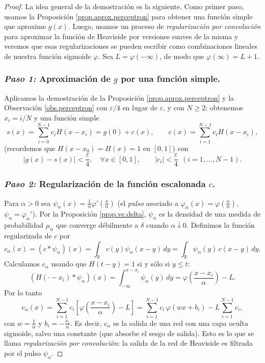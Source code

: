 \documentclass[12pt, a4paper]{amsbook}
\newcommand{\ve}{\varepsilon}
\newcommand{\R}{{\mathbb R}}
\theoremstyle{remark}
\theoremstyle{definition}
\numberwithin{section}{chapter}
\numberwithin{subsection}{section}
\numberwithin{equation}{section}
\numberwithin{figure}{chapter}
\begin{document}
\begin{proof}
La idea general de la demostración es la siguiente. Como primer paso, usamos la Proposición \ref{prop.aprox.perceptron} para obtener una función simple que aproxime $g(x)$. Luego, usamos un proceso de {\em regularización por convolución} para aproximar la función de Heaviside por versiones suaves de la misma y veremos que esas regularizaciones se pueden escribir como combinaciones lineales de nuestra función sigmoide $\varphi$. Sea $L=\varphi(-\infty)$, de modo que $\varphi(\infty)=L+1$.

\subsubsection*{{\em Paso 1:}  Aproximación de $g$ por una función simple.}

Aplicamos la demostración de la Proposición \ref{prop.aprox.perceptron} y la Observación \ref{obs.perceptron} con $\ve/4$ en lugar de $\ve$, y con $N\ge2$: obtenemos $x_i=i/N$ y una función simple
$$
s(x)=\sum_{i=0}^{N-1}c_iH(x-x_i)=g(0)+c(x),\qquad c(x)=\sum_{i=1}^{N-1}c_iH(x-x_i),
$$
(recordemos que $H(x-x_0)=H(x)=1$ en $[0,1]$) con
$$
|g(x)-s(x)|<\frac{\ve}{4},\quad \forall x\in [0, 1],\qquad |c_i|<\frac{\ve}{4}\ \ (i=1,\dots,N-1).
$$

\subsubsection*{{\em Paso 2:} Regularización de la función escalonada $c$.}

Para $\alpha>0$ sea $\psi_\alpha(x) = \frac{1}{\alpha}\varphi'(\frac{x}{\alpha})$ (el {\em pulso} asociado a $\varphi_\alpha(x)=\varphi(\frac{x}{\alpha})$, $\psi_\alpha=\varphi_\alpha'$). Por la Proposición \ref{prop.ve.delta}, $\psi_\alpha$ es la densidad de una medida de probabilidad $\mu_\alpha$ que converge débilmente a $\delta$ cuando $\alpha\downarrow 0$. Definimos la función regularizada de $c$ por
$$
c_\alpha(x) = (c * \psi_\alpha)(x) = \int_\R c(y)\psi_\alpha(x-y)\, dy = \int_\R \psi_\alpha(y)\,c(x-y)\,dy.
$$
Calculamos $c_\alpha$ usando que $H(t-y)=1$ si y sólo si $y\le t$:
$$
(H(\cdot-x_i)*\psi_\alpha)(x)=\int_{-\infty}^{x-x_i}\psi_\alpha(y)\,dy=\varphi\!\left(\frac{x-x_i}{\alpha}\right)-L .
$$
Por lo tanto
$$
c_\alpha(x)=\sum_{i=1}^{N-1}c_i\left[\varphi\!\left(\frac{x-x_i}{\alpha}\right)-L\right]
=\sum_{i=1}^{N-1}c_i\,\varphi(wx+b_i)-L\sum_{i=1}^{N-1}c_i,
$$
con $w=\frac1\alpha$ y $b_i=-\frac{x_i}{\alpha}$. Es decir, $c_\alpha$ es la salida de una red con una capa oculta sigmoide, salvo una constante (que absorbe el sesgo de salida). Esto es lo que se llama {\em regularización por convolución}: la salida de la red de Heaviside es filtrada por el pulso $\psi_\alpha$.


\end{proof}
\end{document}
